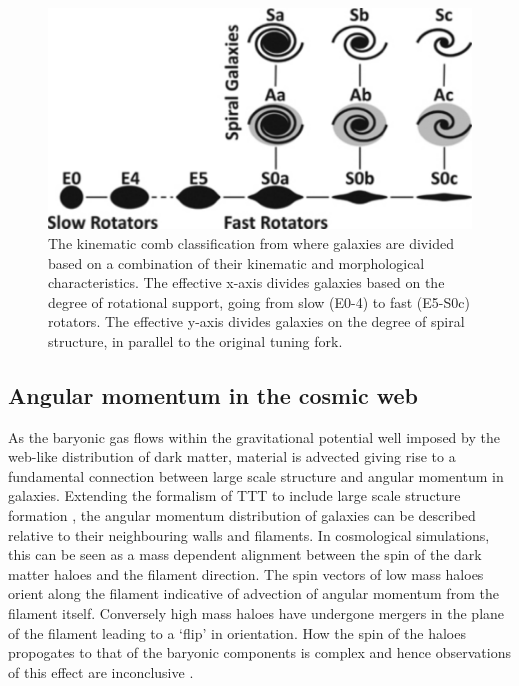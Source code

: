 \begin{figure}
	\includegraphics[width=\linewidth]{thesis/latex/introduction/ifu_comb.pdf}
    \caption{The kinematic comb classification from \citet{cappellari2011} where galaxies are divided based on a combination of their kinematic and morphological characteristics. The effective x-axis divides galaxies based on the degree of rotational support, going from slow (E0-4) to fast (E5-S0c) rotators. The effective y-axis divides galaxies on the degree of spiral structure, in parallel to the original tuning fork.}
    \label{fig:ifu_comb}
\end{figure}

\subsection{Angular momentum in the cosmic web}
As the baryonic gas flows within the gravitational potential well imposed by the web-like distribution of dark matter, material is advected giving rise to a fundamental connection between large scale structure and angular momentum in galaxies. Extending the formalism of TTT to include large scale structure formation \citep[e.g.][]{pichon2011, codis2015, laigle2015}, the angular momentum distribution of galaxies can be described relative to their neighbouring walls and filaments. In cosmological simulations, this can be seen as a mass dependent alignment between the spin of the dark matter haloes and the filament direction. The spin vectors of low mass haloes orient along the filament indicative of advection of angular momentum from the filament itself. Conversely high mass haloes have undergone mergers in the plane of the filament leading to a `flip' in orientation. How the spin of the haloes propogates to that of the baryonic components is complex and hence observations of this effect are inconclusive \citep[e.g.][]{tempel2013, krolewski2019, welker2020}. 

